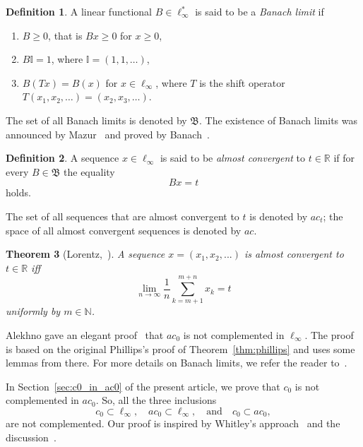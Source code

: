 \documentclass[a4paper,14pt]{article} %
\theoremstyle{plain}
\newtheorem{theorem}{Theorem}[section]
\theoremstyle{definition}
\newtheorem{definition}[theorem]{Definition}
\begin{document}
\begin{definition}
	A linear functional $B\in\ell_\infty^*$ is said to be a \emph{Banach limit} if
	\begin{enumerate}[label=(\roman*)]
		\item
			$B\geq0$, that is $Bx \geq 0$ for $x \geq 0$,
		\item
			$B\mathbb{I}=1$, where $\mathbb{I} =(1,1,\ldots)$,
		\item
			$B(Tx)=B(x)$ for $x\in \ell_\infty$,
			where $T$ is the shift operator $T(x_1,x_2,\ldots)=(x_2,x_3,\ldots)$.
	\end{enumerate}
\end{definition}
The set of all Banach limits is denoted by $\mathfrak{B}$.
The existence of Banach limits was announced by Mazur~\cite{Mazur} and proved by Banach~\cite{banach1993theorie}.

\begin{definition}
	A sequence $x\in \ell_\infty$ is said to be \emph{almost convergent} to $t\in \mathbb{R}$
	if for every $B\in\mathfrak{B}$ the equality
	\begin{equation}
		Bx = t
	\end{equation}
	holds.
\end{definition}
The set of all sequences that are almost convergent to $t$ is denoted by $ac_t$;
the space of all almost convergent sequences is denoted by $ac$.

\begin{theorem}[Lorentz,~\cite{lorentz1948contribution}]
	A sequence $x=(x_1,x_2,...)$ is almost convergent to $t\in\mathbb{R}$ iff
	\begin{equation}
		\label{eq:crit_Lorentz}
		\lim_{n\to\infty} \frac{1}{n} \sum_{k=m+1}^{m+n} x_k = t
	\end{equation}
	uniformly by $m\in\mathbb{N}$.
\end{theorem}

Alekhno gave an elegant proof~\cite[Theorem 8]{alekhno2006propertiesII}
that $ac_0$ is not complemented in $\ell_\infty$.
The proof is based on the original Phillips's proof of Theorem~\ref{thm:phillips}
and uses some lemmas from there.
For more details on Banach limits, we refer the reader to~\cite{sucheston1967banach,Eberlein,semenov2020geomBL}.

In Section~\ref{sec:c0_in_ac0} of the present article, we prove that $c_0$ is not complemented in $ac_0$.
So, all the three inclusions
\begin{equation}
	c_0 \subset \ell_\infty,
	\quad
	ac_0 \subset \ell_\infty,
	\quad\mbox{and}\quad
	c_0 \subset ac_0,
\end{equation}
are not complemented.
Our proof is inspired by Whitley's approach~\cite{whitley1968projecting}
and the discussion~\cite{mathSE_Phillips}.
\end{document}
